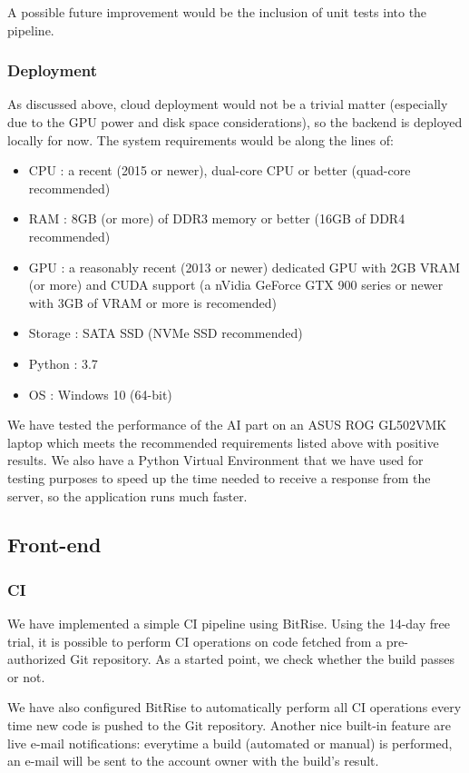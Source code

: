 \documentclass[runningheads,a4paper,11pt]{report}
\begin{document}
A possible future improvement would be the inclusion of unit tests into the pipeline.

\subsubsection{Deployment}

As discussed above, cloud deployment would not be a trivial matter (especially due to the GPU power and disk space considerations), so the backend is deployed locally for now. The system requirements would be along the lines of:

\begin{itemize}
    \item CPU : a recent (2015 or newer), dual-core CPU or better (quad-core recommended)
    \item RAM : 8GB (or more) of DDR3 memory or better (16GB of DDR4 recommended)
    \item GPU : a reasonably recent (2013 or newer) dedicated GPU with 2GB VRAM (or more) and CUDA support (a nVidia GeForce GTX 900 series or newer with 3GB of VRAM or more is recomended)
    \item Storage : SATA SSD (NVMe SSD recommended)
    \item Python : 3.7
    \item OS : Windows 10 (64-bit)
\end{itemize}

We have tested the performance of the AI part on an ASUS ROG GL502VMK laptop which meets the recommended requirements listed above with positive results. We also have a Python Virtual Environment that we have used for testing purposes to speed up the time needed to receive a response from the server, so the application runs much faster. 

\subsection{Front-end}

\subsubsection{CI}

We have implemented a simple CI pipeline using BitRise. Using the 14-day free trial, it is possible to perform CI operations on code fetched from a pre-authorized Git repository. As a started point, we check whether the build passes or not.

We have also configured BitRise to automatically perform all CI operations every time new code is pushed to the Git repository. Another nice built-in feature are live e-mail notifications: everytime a build (automated or manual) is performed, an e-mail will be sent to the account owner with the build's result.
\end{document}
